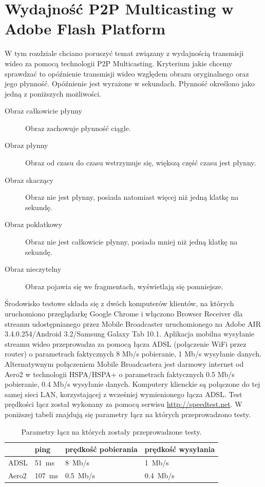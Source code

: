 \section{Wydajność P2P Multicasting w Adobe Flash Platform}
\label{sec:ImplementacjaPrototypuWydajnoscP2P}
W tym rozdziale chciano poruszyć temat związany z wydajnością transmisji wideo za pomocą technologii P2P Multicasting. Kryterium jakie chcemy sprawdzać to opóźnienie transmisji wideo względem obrazu oryginalnego oraz jego płynność. Opóźnienie jest wyrażone w sekundach. Płynność określono jako jedną z poniższych możliwości.
\begin{description}
    \item[Obraz całkowicie płynny] Obraz zachowuje płynność ciągle.
    \item[Obraz płynny] Obraz od czasu do czasu wstrzymuje się, większą część czasu jest płynny.
    \item[Obraz skaczący] Obraz nie jest płynny, posiada natomiast więcej niż jedną klatkę na sekundę.
    \item[Obraz poklatkowy] Obraz nie jest całkowicie płynny, posiada mniej niż jedną klatkę na sekundę.
    \item[Obraz nieczytelny] Obraz pojawia się we fragmentach, wyświetlają się pomniejsze.
\end{description}

Środowisko testowe składa się z dwóch komputerów klientów, na których uruchomiono przeglądarkę Google Chrome i włączono Browser Receiver dla streamu udostępnianego przez Mobile Broadcaster uruchomionego na Adobe AIR 3.4.0.254/Android 3.2/Samsung Galaxy Tab 10.1. Aplikacja mobilna wysyłanie streamu wideo przeprowadza za pomocą łącza ADSL (połączenie WiFi przez router) o parametrach faktycznych 8 Mb/s pobieranie, 1 Mb/s wysyłanie danych. Alternatywnym połączeniem Mobile Broadcastera jest darmowy internet od Aero2 w technologii HSPA/HSPA+ o parametrach faktycznych 0.5 Mb/s pobieranie, 0.4 Mb/s wysyłanie danych. Komputery klienckie są połączone do tej samej sieci LAN, korzystającej z wcześniej wymienionego łącza ADSL. Test prędkości łącz został wykonany za pomocą serwisu \url{http://speedtest.net}. W poniższej tabeli znajdują się parametry łącz na których przeprowadzono testy.

\begin{table}[h]
    \centering
    \begin{tabular}{|l|l|l|l|}
        \hline
        & ping & prędkość pobierania & prędkość wysyłania \\
        \hline
        ADSL
        &
        51~ms
        &
        8~Mb/s
        &
        1~Mb/s
        \\
        \hline
        Aero2
        &
        107~ms
        &
        0.5~Mb/s
        &
        0.4~Mb/s
        \\
        \hline
    \end{tabular}
    \caption{Parametry łącz na których zostały przeprowadzone testy.}
\end{table}

